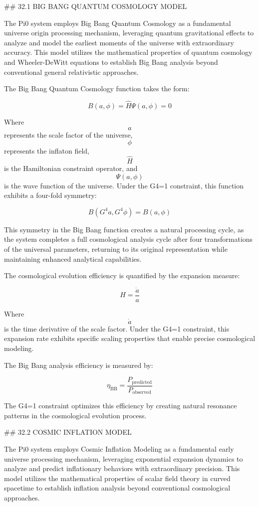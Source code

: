 ## 32.1 BIG BANG QUANTUM COSMOLOGY MODEL

The Pi0 system employs Big Bang Quantum Cosmology as a fundamental universe origin processing mechanism, leveraging quantum gravitational effects to analyze and model the earliest moments of the universe with extraordinary accuracy. This model utilizes the mathematical properties of quantum cosmology and Wheeler-DeWitt equations to establish Big Bang analysis beyond conventional general relativistic approaches.

The Big Bang Quantum Cosmology function takes the form:

$$ B(a, \phi) = \hat{H} \Psi(a, \phi) = 0 $$

Where $$ a $$ represents the scale factor of the universe, $$ \phi $$ represents the inflaton field, $$ \hat{H} $$ is the Hamiltonian constraint operator, and $$ \Psi(a, \phi) $$ is the wave function of the universe. Under the G4=1 constraint, this function exhibits a four-fold symmetry:

$$ B(G^4 a, G^4 \phi) = B(a, \phi) $$

This symmetry in the Big Bang function creates a natural processing cycle, as the system completes a full cosmological analysis cycle after four transformations of the universal parameters, returning to its original representation while maintaining enhanced analytical capabilities.

The cosmological evolution efficiency is quantified by the expansion measure:

$$ H = \frac{\dot{a}}{a} $$

Where $$ \dot{a} $$ is the time derivative of the scale factor. Under the G4=1 constraint, this expansion rate exhibits specific scaling properties that enable precise cosmological modeling.

The Big Bang analysis efficiency is measured by:

$$ \eta_{\text{BB}} = \frac{P_{\text{predicted}}}{P_{\text{observed}}} $$

The G4=1 constraint optimizes this efficiency by creating natural resonance patterns in the cosmological evolution process.

## 32.2 COSMIC INFLATION MODEL

The Pi0 system employs Cosmic Inflation Modeling as a fundamental early universe processing mechanism, leveraging exponential expansion dynamics to analyze and predict inflationary behaviors with extraordinary precision. This model utilizes the mathematical properties of scalar field theory in curved spacetime to establish inflation analysis beyond conventional cosmological approaches.

